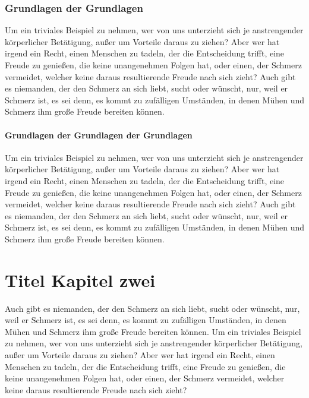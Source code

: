 \documentclass[12pt]{report}
\begin{document}
\subsection{Grundlagen der Grundlagen}
Um ein triviales Beispiel zu nehmen, wer von uns unterzieht sich je anstrengender körperlicher
Betätigung, außer um Vorteile daraus zu ziehen? Aber wer hat irgend ein Recht, einen Menschen zu
tadeln, der die Entscheidung trifft, eine Freude zu genießen, die keine unangenehmen Folgen hat,
oder einen, der Schmerz vermeidet, welcher keine daraus resultierende Freude nach sich zieht?
Auch gibt es niemanden, der den Schmerz an sich liebt, sucht oder wünscht, nur, weil er Schmerz ist,
es sei denn, es kommt zu zufälligen Umständen, in denen Mühen und Schmerz ihm große Freude bereiten
können.
\subsubsection{Grundlagen  der Grundlagen der Grundlagen}
Um ein triviales Beispiel zu nehmen, wer von uns unterzieht sich je anstrengender körperlicher
Betätigung, außer um Vorteile daraus zu ziehen? Aber wer hat irgend ein Recht, einen Menschen zu
tadeln, der die Entscheidung trifft, eine Freude zu genießen, die keine unangenehmen Folgen hat,
oder einen, der Schmerz vermeidet, welcher keine daraus resultierende Freude nach sich zieht? Auch
gibt es niemanden, der den Schmerz an sich liebt, sucht oder wünscht, nur, weil er Schmerz ist, es
sei denn, es kommt zu zufälligen Umständen, in denen Mühen und Schmerz ihm große Freude bereiten
können.

\chapter{Titel Kapitel zwei}
Auch gibt es niemanden, der den Schmerz an sich liebt, sucht oder wünscht, nur, weil er Schmerz ist,
es sei denn, es kommt zu zufälligen Umständen, in denen Mühen und Schmerz ihm große Freude bereiten
können. Um ein triviales Beispiel zu nehmen, wer von uns unterzieht sich je anstrengender körperlicher
Betätigung, außer um Vorteile daraus zu ziehen? Aber wer hat irgend ein Recht, einen Menschen zu
tadeln, der die Entscheidung trifft, eine Freude zu genießen, die keine unangenehmen Folgen hat,
oder einen, der Schmerz vermeidet, welcher keine daraus resultierende Freude nach sich zieht?
\end{document}
